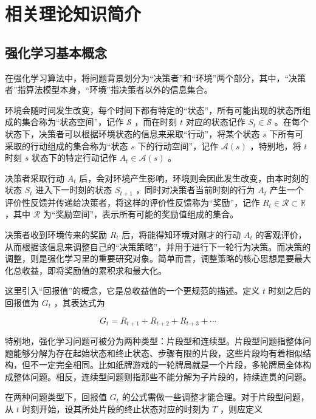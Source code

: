 
\chapter{相关理论知识简介}

\section{强化学习基本概念}

在强化学习算法中，将问题背景划分为“决策者”和“环境”两个部分，其中，“决策者”指算法模型本身，“环境”指决策者以外的信息集合。

环境会随时间发生改变，每个时间下都有特定的“状态”，所有可能出现的状态所组成的集合称为“状态空间”，记作 $\mathcal S$ ，而在时刻 $t$ 对应的状态记作 $S_t\in \mathcal S$ 。在每个状态下，决策者可以根据环境状态的信息来采取“行动”，将某个状态 $s$ 下所有可采取的行动组成的集合称为“状态 $s$ 下的行动空间”，记作 $\mathcal{A}(s)$ ，特别地，将 $t$ 时刻 $s$ 状态下的特定行动记作 $A_t\in\mathcal{A}(s)$ 。

决策者采取行动 $A_t$ 后，会对环境产生影响，环境则会因此发生改变，由本时刻的状态 $S_t$ 进入下一时刻的状态 $S_{t+1}$ ，同时对决策者当前时刻的行为 $A_t$ 产生一个评价性反馈并传递给决策者，将这样的评价性反馈称为“奖励”，记作 $R_{t}\in\mathcal{R}\subset\mathbb{R}$ ，其中 $\mathcal{R}$ 为“奖励空间”，表示所有可能的奖励值组成的集合。

决策者收到环境传来的奖励 $R_{t}$ 后，将能得知环境对刚才的行动 $A_t$ 的客观评价，从而根据该信息来调整自己的“决策策略”，并用于进行下一轮行为决策。而决策的调整，则是强化学习里的重要研究对象。简单而言，调整策略的核心思想是要最大化总收益，即将奖励值的累积求和最大化。

这里引入“回报值”的概念，它是总收益值的一个更规范的描述。定义 $t$ 时刻之后的回报值为 $G_t$ ，其表达式为

\begin{equation}
G_t = R_{t+1}+R_{t+2}+R_{t+3}+\cdots
\end{equation}

特别地，强化学习问题可被分为两种类型：片段型和连续型。片段型问题指整体问题能够分解为存在起始状态和终止状态、步骤有限的片段，这些片段均有着相似结构，但不一定完全相同。比如纸牌游戏的一轮牌局就是一个片段，多轮牌局全体构成整体问题。相反，连续型问题则指那些不能分解为子片段的，持续连贯的问题。

在两种问题类型下，回报值 $G_t$ 的公式需做一些调整才能合理。对于片段型问题，从 $t$ 时刻开始，设其所处片段的终止状态对应的时刻为 $T$ ，则应定义

